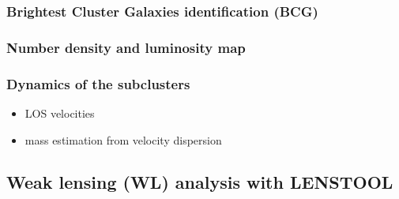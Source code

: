 \documentclass[letterpaper,useAMS,usenatbib]{mn2e}
\begin{document}
\subsubsection{Brightest Cluster Galaxies identification (BCG)}
\subsubsection{Number density and luminosity map}

% 
% 
% 

\subsubsection{Dynamics of the subclusters}
\begin{itemize}
		\item LOS velocities
		\item mass estimation from velocity dispersion 
\end{itemize}

\subsection{Weak lensing (WL) analysis with LENSTOOL}
\end{document}
